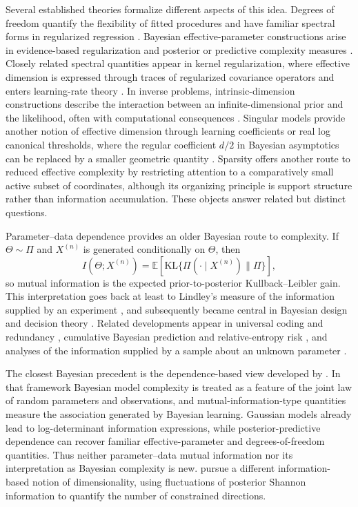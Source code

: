 \documentclass[11pt]{article}
\theoremstyle{plain}
\theoremstyle{definition}
\theoremstyle{remark}
\newcommand{\E}{\mathbb{E}}
\newcommand{\KL}{\mathrm{KL}}
\begin{document}
Several established theories formalize different aspects of this idea. Degrees of freedom quantify the flexibility of fitted procedures and have familiar spectral forms in regularized regression \citep{efron2004least,hastie2009elements}. Bayesian effective-parameter constructions arise in evidence-based regularization and posterior or predictive complexity measures \citep{mackay1992bayesian,spiegelhalter2002bayesian}. Closely related spectral quantities appear in kernel regularization, where effective dimension is expressed through traces of regularized covariance operators and enters learning-rate theory \citep{caponnetto2007optimal}. In inverse problems, intrinsic-dimension constructions describe the interaction between an infinite-dimensional prior and the likelihood, often with computational consequences \citep{agapiou2017importance}. Singular models provide another notion of effective dimension through learning coefficients or real log canonical thresholds, where the regular coefficient \(d/2\) in Bayesian asymptotics can be replaced by a smaller geometric quantity \citep{watanabe2009algebraic}. Sparsity offers another route to reduced effective complexity by restricting attention to a comparatively small active subset of coordinates, although its organizing principle is support structure rather than information accumulation. These objects answer related but distinct questions.

Parameter--data dependence provides an older Bayesian route to complexity. If \(\Theta\sim\Pi\) and \(X^{(n)}\) is generated conditionally on \(\Theta\), then
\[
I(\Theta;X^{(n)})
=
\E\!\left[
\KL\{\Pi(\cdot\mid X^{(n)})\|\Pi\}
\right],
\]
so mutual information is the expected prior-to-posterior Kullback--Leibler gain. This interpretation goes back at least to Lindley's measure of the information supplied by an experiment \citep{lindley1956measure}, and subsequently became central in Bayesian design and decision theory \citep{bernardo1979expected}. Related developments appear in universal coding and redundancy \citep{rissanen1986,clarke1990information}, cumulative Bayesian prediction and relative-entropy risk \citep{haussler1997mutual}, and analyses of the information supplied by a sample about an unknown parameter \citep{ebrahimi2010sample}.

The closest Bayesian precedent is the dependence-based view developed by \citet{van2004association,van2012bayesian}. In that framework Bayesian model complexity is treated as a feature of the joint law of random parameters and observations, and mutual-information-type quantities measure the association generated by Bayesian learning. Gaussian models already lead to log-determinant information expressions, while posterior-predictive dependence can recover familiar effective-parameter and degrees-of-freedom quantities. Thus neither parameter--data mutual information nor its interpretation as Bayesian complexity is new. \citet{handley2019bayesian} pursue a different information-based notion of dimensionality, using fluctuations of posterior Shannon information to quantify the number of constrained directions.
\end{document}
